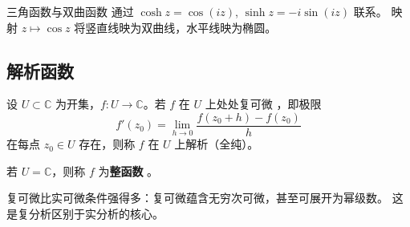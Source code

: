 \begin{remark}
三角函数与双曲函数  通过 $\cosh z = \cos(iz)$, $\sinh z = -i\sin(iz)$ 联系。
映射 $z \mapsto \cos z$ 将竖直线映为双曲线，水平线映为椭圆。
\end{remark}

\subsection{解析函数}

\begin{definition}
设 $U \subset \mathbb{C}$ 为开集，$f: U \to \mathbb{C}$。若 $f$ 在 $U$ 上处处复可微
，即极限
\[
  f'(z_0) = \lim_{h \to 0} \frac{f(z_0+h) - f(z_0)}{h}
\]
在每点 $z_0 \in U$ 存在，则称 $f$ 在 $U$ 上解析（全纯）。

若 $U = \mathbb{C}$，则称 $f$ 为\textbf{整函数} 。
\end{definition}

\begin{remark}
复可微比实可微条件强得多：复可微蕴含无穷次可微，甚至可展开为幂级数。
这是复分析区别于实分析的核心。
\end{remark}
